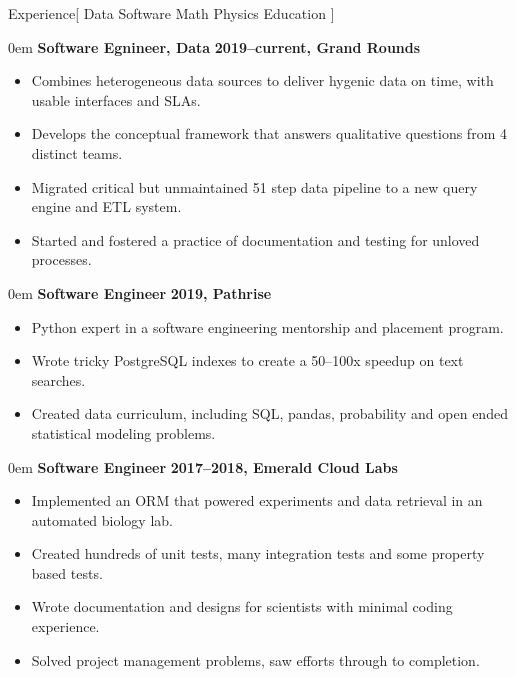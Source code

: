 \documentclass[11pt,a4paper]{article}
\newenvironment{headedsection}[2]{
    \begin{addmargin}[0.5em]{0em}
    {\large\bfseries #1} \hfill {\bfseries #2}%
    \begin{itemize}
        [label={}, topsep=0pt, itemsep=1.5pt, parsep=0pt, leftmargin=1.5em]
}{
    \end{itemize}
    \end{addmargin}
    \medskip
}
\begin{document}
\sloppy  %


\vspace{1em}

\begin{mysection}{Experience}[
    Data
    \textbullet{} Software
    \textbullet{} Math
    \textbullet{} Physics
    \textbullet{} Education
]

  \begin{headedsection}
        {Software Egnineer, Data}
        {2019--current, Grand Rounds}

    \item Combines heterogeneous data sources to deliver hygenic data on time,
          with usable interfaces and SLAs.
    \item Develops the conceptual framework that answers qualitative questions
          from 4 distinct teams.
    \item Migrated critical but unmaintained 51 step data pipeline to a new
          query engine and ETL system.
    \item Started and fostered a practice of documentation and testing for
          unloved processes.

  \end{headedsection}

  \begin{headedsection}
        {Software Engineer}
        {2019, Pathrise}

    \item Python expert in a software engineering mentorship and placement
          program.
    \item Wrote tricky PostgreSQL indexes to create a 50--100x speedup on text
          searches.
    \item Created data curriculum, including SQL, pandas, probability and open
          ended statistical modeling problems.

  \end{headedsection}

  \begin{headedsection}
        {Software Engineer}
        {2017--2018, Emerald Cloud Labs}

    \item Implemented an ORM that powered experiments and data retrieval in an
          automated biology lab.
    \item Created hundreds of unit tests, many integration tests and some
          property based tests.
    \item Wrote documentation and designs for scientists with minimal coding
          experience.
    \item Solved project management problems, saw efforts through to completion.


\end{headedsection}
\end{mysection}
\end{document}
